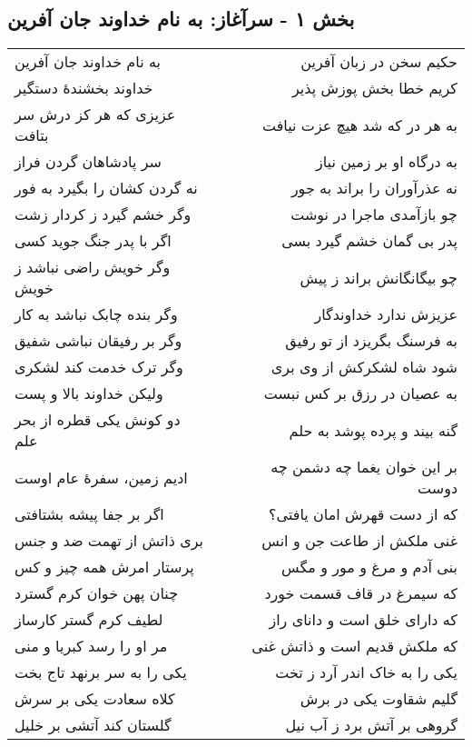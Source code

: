 \begin{center}
\section*{بخش ۱ - سرآغاز: به نام خداوند جان آفرین}
\label{sec:001}
\begin{longtable}{l p{0.5cm} r}
به نام خداوند جان آفرین
&&
حکیم سخن در زبان آفرین
\\
خداوند بخشندهٔ دستگیر
&&
کریم خطا بخش پوزش پذیر
\\
عزیزی که هر کز درش سر بتافت
&&
به هر در که شد هیچ عزت نیافت
\\
سر پادشاهان گردن فراز
&&
به درگاه او بر زمین نیاز
\\
نه گردن کشان را بگیرد به فور
&&
نه عذرآوران را براند به جور
\\
وگر خشم گیرد ز کردار زشت
&&
چو بازآمدی ماجرا در نوشت
\\
اگر با پدر جنگ جوید کسی
&&
پدر بی گمان خشم گیرد بسی
\\
وگر خویش راضی نباشد ز خویش
&&
چو بیگانگانش براند ز پیش
\\
وگر بنده چابک نباشد به کار
&&
عزیزش ندارد خداوندگار
\\
وگر بر رفیقان نباشی شفیق
&&
به فرسنگ بگریزد از تو رفیق
\\
وگر ترک خدمت کند لشکری
&&
شود شاه لشکرکش از وی بری
\\
ولیکن خداوند بالا و پست
&&
به عصیان در رزق بر کس نبست
\\
دو کونش یکی قطره از بحر علم
&&
گنه بیند و پرده پوشد به حلم
\\
ادیم زمین، سفرهٔ عام اوست
&&
بر این خوان یغما چه دشمن چه دوست
\\
اگر بر جفا پیشه بشتافتی
&&
که از دست قهرش امان یافتی؟
\\
بری ذاتش از تهمت ضد و جنس
&&
غنی ملکش از طاعت جن و انس
\\
پرستار امرش همه چیز و کس
&&
بنی آدم و مرغ و مور و مگس
\\
چنان پهن خوان کرم گسترد
&&
که سیمرغ در قاف قسمت خورد
\\
لطیف کرم گستر کارساز
&&
که دارای خلق است و دانای راز
\\
مر او را رسد کبریا و منی
&&
که ملکش قدیم است و ذاتش غنی
\\
یکی را به سر برنهد تاج بخت
&&
یکی را به خاک اندر آرد ز تخت
\\
کلاه سعادت یکی بر سرش
&&
گلیم شقاوت یکی در برش
\\
گلستان کند آتشی بر خلیل
&&
گروهی بر آتش برد ز آب نیل
\\

\end{longtable}
\end{center}

